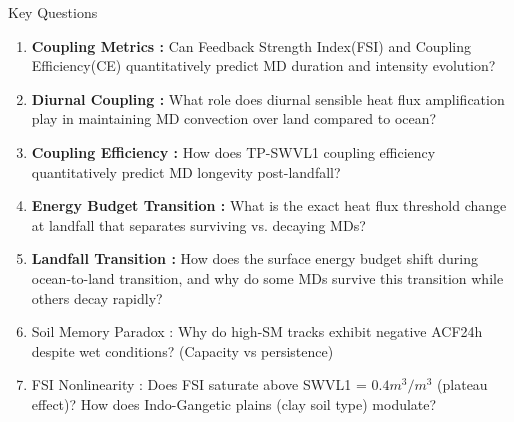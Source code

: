 \documentclass[8pt, aspectratio=169]{beamer}
\begin{document}
\begin{frame}{}
\begin{block}{Key Questions}
\begin{enumerate}
            \item \textbf{Coupling Metrics :} Can Feedback Strength Index(FSI) and Coupling Efficiency(CE) quantitatively predict MD duration and intensity evolution?
            \item \textbf{Diurnal Coupling :} What role does diurnal sensible heat flux amplification play in maintaining MD convection over land compared to ocean?
            \item \textbf{Coupling Efficiency :} How does TP-SWVL1 coupling efficiency quantitatively predict MD longevity post-landfall?
            \item \textbf{Energy Budget Transition :} What is the exact heat flux threshold change at landfall that separates surviving vs. decaying MDs?
            \item \textbf{Landfall Transition :} How does the surface energy budget shift during ocean-to-land transition, and why do some MDs survive this transition while others decay rapidly?
            \item Soil Memory Paradox : Why do high-SM tracks exhibit negative ACF24h despite wet conditions? (Capacity vs persistence) %
            \item FSI Nonlinearity : Does FSI saturate above SWVL1 = $0.4 m^3/m^3$ (plateau effect)? How does Indo-Gangetic plains (clay soil type) modulate? %

\end{enumerate}
\end{block}
\end{frame}
\end{document}
